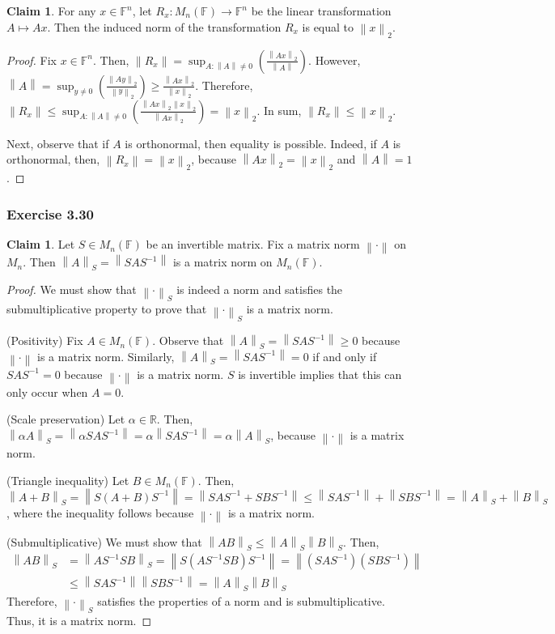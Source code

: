\documentclass[letterpaper,12pt]{article}
\theoremstyle{definition}
\newtheorem{claim}[theorem]{Claim}
\newcommand{\norm}[1]{\left\lVert#1\right\rVert}
\begin{document}
\begin{claim}
	For any $x \in \mathbb{F}^n$, let $R_x : M_n (\mathbb{F}) \to \mathbb{F}^n$ be the linear transformation $A \mapsto Ax$. Then the induced norm of the transformation $R_x$ is equal to $\norm{x}_2$.
\end{claim}
\begin{proof}
	
	Fix $x \in \mathbb{F}^n$. Then, $\norm{R_x} = \sup_{A : \norm{A} \neq 0}\left( \frac{\norm{Ax}_2}{\norm{A}} \right)$. However, $\norm{A} = \sup_{y \neq 0} \left( \frac{\norm{Ay}_2}{\norm{y}_2}\right) \geq  \frac{\norm{Ax}_2}{\norm{x}_2}$. Therefore, $\norm{R_x} \leq \sup_{A : \norm{A} \neq 0}\left( \frac{\norm{Ax}_2 \norm{x}_2}{\norm{Ax}_2} \right) = \norm{x}_2$. In sum, $\norm{R_x}  \leq \norm{x}_2$.
	
	Next, observe that if $A$ is orthonormal, then equality is possible. Indeed, if $A$ is orthonormal, then, $\norm{R_x}  = \norm{x}_2$, because $\norm{Ax}_2 = \norm{x}_2$ and $\norm{A} = 1$. 
\end{proof}

\subsubsection*{Exercise 3.30}
\begin{claim}
	Let $S \in M_n(\mathbb{F})$ be an invertible matrix. Fix a matrix norm $\norm{\cdot}$ on $M_n$. Then $\norm{A}_S = \norm{SAS^{-1}}$ is a matrix norm on $M_n(\mathbb{F})$.
\end{claim}
\begin{proof}
	We must show that $\norm{\cdot}_S$ is indeed a norm and satisfies the submultiplicative property to prove that $\norm{\cdot}_S$ is a matrix norm.
	
	(Positivity)  Fix $A \in M_n(\mathbb{F})$. Observe that $\norm{A}_S = \norm{SAS^{-1}} \geq 0$ because $\norm{\cdot}$ is a matrix norm. Similarly, $\norm{A}_S = \norm{SAS^{-1}} = 0$ if and only if $SAS^{-1} = 0$ because $\norm{\cdot}$ is a matrix norm. $S$ is invertible implies that this can only occur when $A = 0$. 
	
	(Scale preservation) Let $\alpha \in \mathbb{R}$. Then, $\norm{\alpha A}_S = \norm{\alpha SAS^{-1}} = \alpha\norm{SAS^{-1}} = \alpha \norm{A}_S$, because $\norm{\cdot}$ is a matrix norm.
	
	(Triangle inequality) Let $B \in M_n(\mathbb{F})$. Then, $\norm{A + B}_S = \norm{S(A+B)S^{-1}} = \norm{SAS^{-1} + SBS^{-1}} \leq \norm{SAS^{-1}} + \norm{SBS^{-1}} = \norm{A}_S + \norm{B}_S$, where the inequality follows because $\norm{\cdot}$ is a matrix norm.
	
	(Submultiplicative) We must show that $\norm{AB}_S \leq \norm{A}_S\norm{B}_S$. Then,
	\begin{align*}
	\norm{AB}_S 
	&= \norm{AS^{-1}SB}_S = \norm{S(AS^{-1}SB)S^{-1}} = \norm{(SAS^{-1})(SBS^{-1})} \\
	&\leq \norm{SAS^{-1}}\norm{SBS^{-1}} = \norm{A}_S\norm{B}_S
	\end{align*}
	Therefore, $\norm{\cdot}_S$ satisfies the properties of a norm and is submultiplicative. Thus, it is a matrix norm.
\end{proof}
\end{document}
